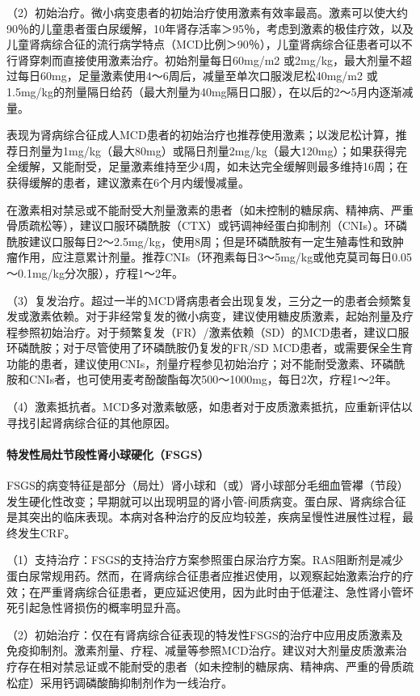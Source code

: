 （2）初始治疗。微小病变患者的初始治疗使用激素有效率最高。激素可以使大约90％的儿童患者蛋白尿缓解，10年肾存活率＞95％，考虑到激素的极佳疗效，以及儿童肾病综合征的流行病学特点（MCD比例＞90％），儿童肾病综合征患者可以不行肾穿刺而直接使用激素治疗。初始剂量每日60mg/m{2}
或2mg/kg，最大剂量不超过每日60mg，足量激素使用4～6周后，减量至单次口服泼尼松40mg/m{2}
或1.5mg/kg的剂量隔日给药（最大剂量为40mg隔日口服），在以后的2～5月内逐渐减量。

表现为肾病综合征成人MCD患者的初始治疗也推荐使用激素；以泼尼松计算，推荐日剂量为1mg/kg（最大80mg）或隔日剂量2mg/kg（最大120mg）；如果获得完全缓解，又能耐受，足量激素维持至少4周，如未达完全缓解则最多维持16周；在获得缓解的患者，建议激素在6个月内缓慢减量。

在激素相对禁忌或不能耐受大剂量激素的患者（如未控制的糖尿病、精神病、严重骨质疏松等），建议口服环磷酰胺（CTX）或钙调神经蛋白抑制剂（CNIs）。环磷酰胺建议口服每日2～2.5mg/kg，使用8周；但是环磷酰胺有一定生殖毒性和致肿瘤作用，应注意累计剂量。推荐CNIs（环孢素每日3～5mg/kg或他克莫司每日0.05～0.1mg/kg分次服），疗程1～2年。

（3）复发治疗。超过一半的MCD肾病患者会出现复发，三分之一的患者会频繁复发或激素依赖。对于非经常复发的微小病变，建议使用糖皮质激素，起始剂量及疗程参照初始治疗。对于频繁复发（FR）/激素依赖（SD）的MCD患者，建议口服环磷酰胺；对于尽管使用了环磷酰胺仍复发的FR/SD
MCD患者，或需要保全生育功能的患者，建议使用CNIs，剂量疗程参见初始治疗；对不能耐受激素、环磷酰胺和CNIs者，也可使用麦考酚酸酯每次500～1000mg，每日2次，疗程1～2年。

（4）激素抵抗者。MCD多对激素敏感，如患者对于皮质激素抵抗，应重新评估以寻找引起肾病综合征的其他原因。
\paragraph{特发性局灶节段性肾小球硬化（FSGS）}

FSGS的病变特征是部分（局灶）肾小球和（或）肾小球部分毛细血管襻（节段）发生硬化性改变；早期就可以出现明显的肾小管-间质病变。蛋白尿、肾病综合征是其突出的临床表现。本病对各种治疗的反应均较差，疾病呈慢性进展性过程，最终发生CRF。

（1）支持治疗：FSGS的支持治疗方案参照蛋白尿治疗方案。RAS阻断剂是减少蛋白尿常规用药。然而，在肾病综合征患者应推迟使用，以观察起始激素治疗的疗效；在严重肾病综合征患者，更应延迟使用，因为此时由于低灌注、急性肾小管坏死引起急性肾损伤的概率明显升高。

（2）初始治疗：仅在有肾病综合征表现的特发性FSGS的治疗中应用皮质激素及免疫抑制剂。激素剂量、疗程、减量等参照MCD治疗。建议对大剂量皮质激素治疗存在相对禁忌证或不能耐受的患者（如未控制的糖尿病、精神病、严重的骨质疏松症）采用钙调磷酸酶抑制剂作为一线治疗。

